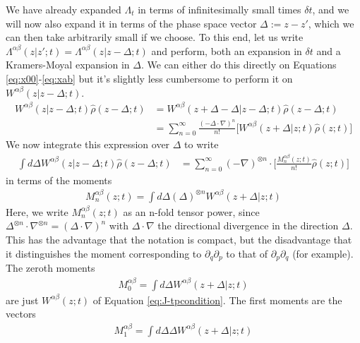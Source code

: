 \documentclass[aps,pra,showpacs,citeautoscript,amsmath,amssymb,floatfix,superscriptaddress,bbm, verbatim,amsfonts,changes,10pt,nofootinbib,longbibliography]{revtex4-1}
\def\X{\Lambda}
\def\z{{z}}
\def\dist{{\Delta}}
\def\ddist{{d\!\dist}}
\def\dt{\delta t}
\def\rate{{W}}
\def\ab{^{\alpha\beta}}
\newcommand{\M}[1]{M_{#1}\ab}
\renewcommand{\varrho}{\hat{\rho}}
\def\psiz{{\varrho(\z;t)}}
\def\psizd{{\varrho(\z-\dist;t)}}
\begin{document}
We have already expanded $\X_t$ in terms of infinitesimally small times $\dt$, and we will now also expand it in terms of the phase space vector $\dist:=\z-\z'$, which we can then take arbitrarily small if we choose.  
To this end, let us write $\X^{\alpha\beta}(\z|\z';t)=\X^{\alpha\beta}(\z|\z-\dist;t)$ 
and perform, both an expansion in $\dt$ and a Kramers-Moyal expansion\cite{kramers1940brownian,moyal1949stochastic} in $\dist$. We can either do this directly on
Equations \eqref{eq:x00}-\eqref{eq:xab} but it's slightly less cumbersome to perform it on $\rate^{\alpha\beta}(\z|\z-\dist;t)$.
\begin{align}
\rate^{\alpha\beta}(\z|\z-\dist;t)\psizd
&=\rate^{\alpha\beta}(\z+\dist-\dist|\z-\dist;t)\psizd
\nonumber\\
&=\sum_{n=0}^\infty\frac{(-\dist\cdot\nabla)^n}{n!}\big[\rate^{\alpha\beta}(\z+\dist|\z;t)\psiz\big]
\end{align}
We now integrate this expression over $\dist$ to write
\begin{align}
\int \ddist\rate^{\alpha\beta}(\z|\z-\dist;t)\psizd
&=\sum_{n=0}^\infty(-\nabla)^{\otimes n}\cdot\big[\frac{\M{n}(\z;t)}{n!}\psiz\big]
\end{align}
in terms of the moments
\begin{align}
{\M{n}(\z;t)}=\int\ddist (\dist)^{\otimes n} \rate^{\alpha\beta}(\z+\dist|\z;t)
\label{eq:momentdef}
\end{align}
Here, we write $\M{n}(\z;t)$ as an n-fold tensor power, since $\dist^{\otimes n}\cdot\nabla^{\otimes n}=(\dist\cdot\nabla)^n$ with $\dist\cdot\nabla$ the directional divergence in the direction $\dist$. This has the advantage that the notation is compact, but the disadvantage that it distinguishes the moment corresponding to $\partial_q\partial_p$ to that of $\partial_p\partial_q$ (for example).
The zeroth moments
\begin{align}
\M{0}=\int\ddist W\ab(\z+\dist|\z;t)
\label{eq:zeroeth}
\end{align}
are just $W\ab(\z;t)$ of Equation \eqref{eq:J-tpcondition}. The first moments are the vectors
\begin{align}
\M{1}=\int\ddist \dist W\ab(\z+\dist|\z;t)
\end{align}
\end{document}
